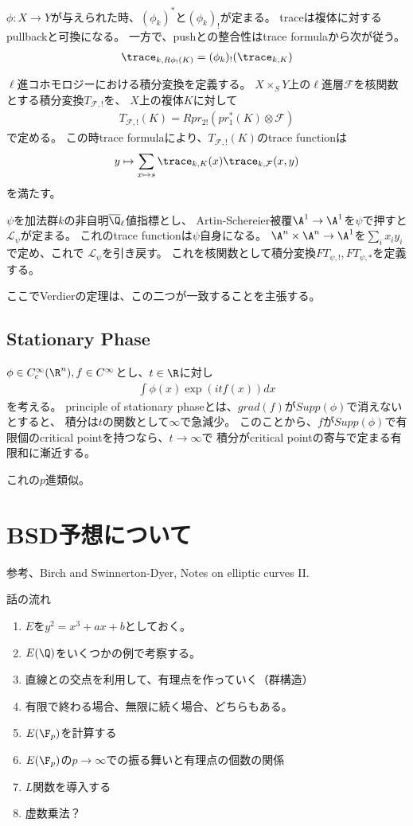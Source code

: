 \documentclass[uplatex, a4paper]{jsbook}
\begin{document}
$\phi:X \to Y$が与えられた時、$(\phi_k)^*$と$(\phi_k)_!$が定まる。
traceは複体に対するpullbackと可換になる。
一方で、pushとの整合性はtrace formulaから次が従う。
\begin{align*}
  \trace_{k,R\phi_!(K)}=(\phi_k)_!(\trace_{k,K})
\end{align*}

$\ell$進コホモロジーにおける積分変換を定義する。
$X\times_SY$上の$\ell$進層$\mathcal{F}$を核関数とする積分変換$T_{\mathcal{F},!}$を、
$X$上の複体$K$に対して
\begin{align*}
  T_{\mathcal{F},!}(K)=Rpr_{2!}(pr_1^*(K)\otimes\mathcal{F})
\end{align*}
で定める。
この時trace formulaにより、$T_{\mathcal{F},!}(K)$のtrace functionは
\begin{align*}
  y\mapsto\sum_{x\mapsto s}\trace_{k,K}(x)\trace_{k,\mathcal{F}}(x,y)
\end{align*}
を満たす。

$\psi$を加法群$k$の非自明$\overline{\Q}_\ell$値指標とし、
Artin-Schereier被覆$\A^1\to\A^1$を$\psi$で押すと$\mathcal{L}_\psi$が定まる。
これのtrace functionは$\psi$自身になる。
$\A^n\times\A^n\to \A^1$を$\sum_ix_iy_i$で定め、これで $\mathcal{L}_\psi$を引き戻す。
これを核関数として積分変換$FT_{\psi,!}, FT_{\psi,*}$を定義する。

ここでVerdierの定理は、この二つが一致することを主張する。

\section{Stationary Phase}
$\phi\in C^\infty_c(\R^n), f\in C^\infty$とし、$t\in\R$に対し
\begin{align*}
  \int\phi(x)\exp(itf(x))dx
\end{align*}
を考える。
principle of stationary phaseとは、$grad(f)$が$Supp(\phi)$で消えないとすると、
積分は$t$の関数として$\infty$で急減少。
このことから、$f$が$Supp(\phi)$で有限個のcritical pointを持つなら、$t\to \infty$で
積分がcritical pointの寄与で定まる有限和に漸近する。

これの$p$進類似。

\chapter{BSD予想について}

参考、Birch and Swinnerton-Dyer, Notes on elliptic curves II.

話の流れ
\begin{enumerate}
\item $E$を$y^2=x^3+ax+b$としておく。
\item $E(\Q)$をいくつかの例で考察する。
\item 直線との交点を利用して、有理点を作っていく（群構造）
\item 有限で終わる場合、無限に続く場合、どちらもある。
\item $E(\F_p)$を計算する
\item $E(\F_p)$の$p \to \infty$での振る舞いと有理点の個数の関係
\item $L$関数を導入する
\item 虚数乗法？
\end{enumerate}
\end{document}
